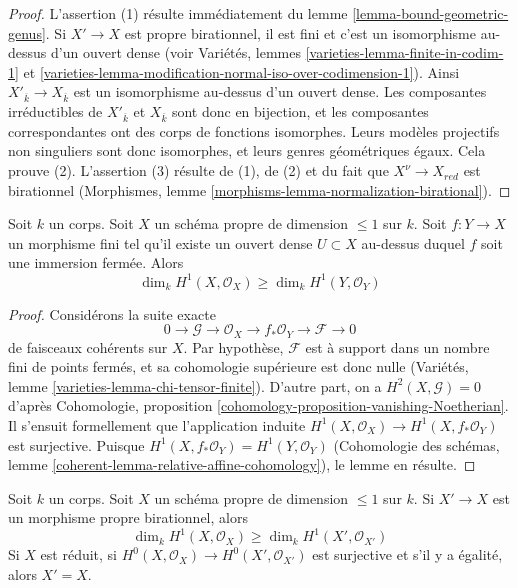 \begin{proof}
L'assertion (1) résulte immédiatement du lemme \ref{lemma-bound-geometric-genus}. Si $X' \to X$ est propre birationnel, il est fini et c'est un isomorphisme au-dessus d'un ouvert dense (voir Variétés, lemmes \ref{varieties-lemma-finite-in-codim-1} et \ref{varieties-lemma-modification-normal-iso-over-codimension-1}). Ainsi $X'_{\overline{k}} \to X_{\overline{k}}$ est un isomorphisme au-dessus d'un ouvert dense. Les composantes irréductibles de $X'_{\overline{k}}$ et $X_{\overline{k}}$ sont donc en bijection, et les composantes correspondantes ont des corps de fonctions isomorphes. Leurs modèles projectifs non singuliers sont donc isomorphes, et leurs genres géométriques égaux. Cela prouve (2). L'assertion (3) résulte de (1), de (2) et du fait que $X^\nu \to X_{red}$ est birationnel (Morphismes, lemme \ref{morphisms-lemma-normalization-birational}).
\end{proof}

\begin{lemma}
\label{lemma-genus-goes-down}
Soit $k$ un corps. Soit $X$ un schéma propre de dimension $\leq 1$ sur $k$. Soit $f : Y \to X$ un morphisme fini tel qu'il existe un ouvert dense $U \subset X$ au-dessus duquel $f$ soit une immersion fermée. Alors
$$
\dim_k H^1(X, \mathcal{O}_X) \geq \dim_k H^1(Y, \mathcal{O}_Y)
$$
\end{lemma}

\begin{proof}
Considérons la suite exacte $$
0 \to \mathcal{G} \to \mathcal{O}_X \to f_*\mathcal{O}_Y \to \mathcal{F} \to 0
$$ de faisceaux cohérents sur $X$. Par hypothèse, $\mathcal{F}$ est à support dans un nombre fini de points fermés, et sa cohomologie supérieure est donc nulle (Variétés, lemme \ref{varieties-lemma-chi-tensor-finite}). D'autre part, on a $H^2(X, \mathcal{G}) = 0$ d'après Cohomologie, proposition \ref{cohomology-proposition-vanishing-Noetherian}. Il s'ensuit formellement que l'application induite $H^1(X, \mathcal{O}_X) \to H^1(X, f_*\mathcal{O}_Y)$ est surjective. Puisque $H^1(X, f_*\mathcal{O}_Y) = H^1(Y, \mathcal{O}_Y)$ (Cohomologie des schémas, lemme \ref{coherent-lemma-relative-affine-cohomology}), le lemme en résulte.
\end{proof}

\begin{lemma}
\label{lemma-genus-normalization}
Soit $k$ un corps. Soit $X$ un schéma propre de dimension $\leq 1$ sur $k$. Si $X' \to X$ est un morphisme propre birationnel, alors $$
\dim_k H^1(X, \mathcal{O}_X) \geq \dim_k H^1(X', \mathcal{O}_{X'})
$$ Si $X$ est réduit, si $H^0(X, \mathcal{O}_X) \to H^0(X', \mathcal{O}_{X'})$ est surjective et s'il y a égalité, alors $X' = X$.
\end{lemma}

